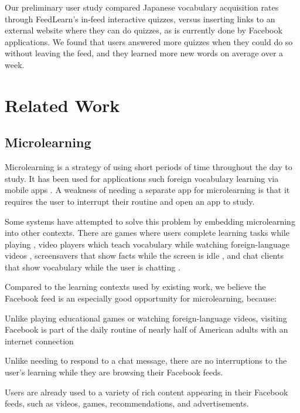 \documentclass{sigchi}
\begin{document}
Our preliminary user study compared Japanese vocabulary acquisition rates through FeedLearn's in-feed interactive quizzes, versus inserting links to an external website where they can do quizzes, as is currently done by Facebook applications. We found that users answered more quizzes when they could do so without leaving the feed, and they learned more new words on average over a week. %

\section{Related Work}

\subsection{Microlearning}

Microlearning is a strategy of using short periods of time throughout the day to study. It has been used for applications such foreign vocabulary learning via mobile apps \cite{microlearning} \cite{micromandarin}. A weakness of needing a separate app for microlearning is that it requires the user to interrupt their routine and open an app to study. %

Some systems have attempted to solve this problem by embedding microlearning into other contexts. There are games where users complete learning tasks while playing \cite{carriearcade}, video players which teach vocabulary while watching foreign-language videos \cite{smartsubtitles}, screensavers that show facts while the screen is idle \cite{screensaver}, and chat clients that show vocabulary while the user is chatting \cite{waitlearning}.

Compared to the learning contexts used by existing work, we believe the Facebook feed is an especially good opportunity for microlearning, because:

\begin{compactitem}
\item Unlike playing educational games or watching foreign-language videos, visiting Facebook is part of the daily routine of nearly half of American adults with an internet connection \cite{socialmediaupdate} %
\item Unlike needing to respond to a chat message, there are no interruptions to the user's learning while they are browsing their Facebook feeds.
\item Users are already used to a variety of rich content appearing in their Facebook feeds, such as videos, games, recommendations, and advertisements.
\end{compactitem}
\end{document}
